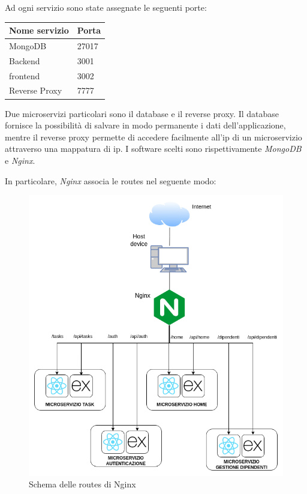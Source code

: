 \documentclass{report}
\begin{document}
Ad ogni servizio sono state assegnate le seguenti porte:

\begin{center} %
	\centering
	\begin{tabular}{ |p{4cm}|p{4cm}|  }
		\hline
		\centering Nome servizio & \qquad\qquad Porta \\ %
		\hline
		MongoDB                  & 27017              \\
		\hline
		Backend                  & 3001               \\
		\hline
		frontend                 & 3002               \\
		\hline
		Reverse Proxy            & 7777               \\
		\hline
	\end{tabular}
\end{center}

Due microservizi particolari sono il database e il reverse proxy. Il database fornisce la possibilità di salvare in modo permanente i dati dell'applicazione, mentre il reverse proxy permette di accedere facilmente all'ip di un microservizio attraverso una mappatura di ip. I software scelti sono rispettivamente \textit{MongoDB} e \textit{Nginx}.

In particolare, \textit{Nginx} associa le routes nel seguente modo:
\begin{figure}[H]
	\centering\includegraphics[width=1\textwidth]{images/nginx.png}
	Schema delle routes di Nginx
\end{figure}
\end{document}
